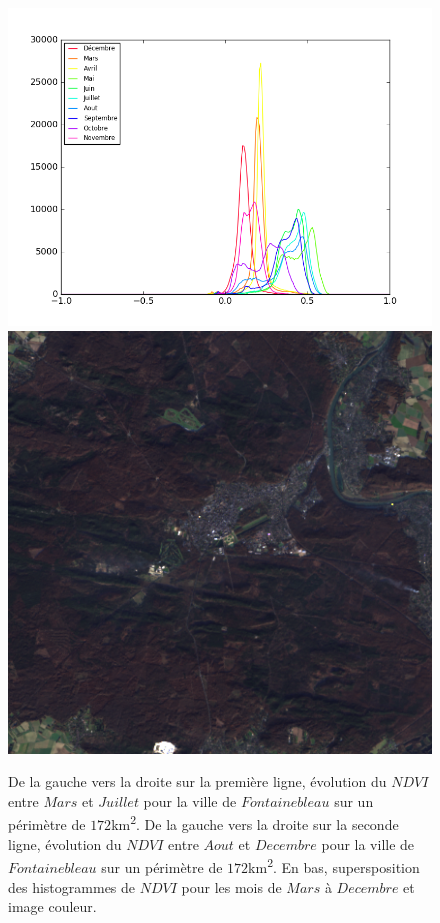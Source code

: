 \documentclass{book}
\begin{document}
\begin{figure}[H]
\begin{center}
\includegraphics[scale=0.45]{images/Fontainebleau/all_ndvi_histo.png}
\includegraphics[scale=0.4]{images/Fontainebleau/12_rgb.png}
\end{center}
\caption{De la gauche vers la droite sur la première ligne, évolution du $NDVI$ entre $Mars$ et $Juillet$ pour la ville de $Fontainebleau$ sur un périmètre de $172$km\textsuperscript{2}.
De la gauche vers la droite sur la seconde ligne, évolution du $NDVI$ entre $Aout$ et $Decembre$ pour la ville de $Fontainebleau$ sur un périmètre de $172$km\textsuperscript{2}. 
En bas, supersposition des histogrammes de $NDVI$ pour les mois de $Mars$ à $Decembre$ et image couleur.}
\label{fontainebleau_ndvi_annee}
\end{figure}
\end{document}
